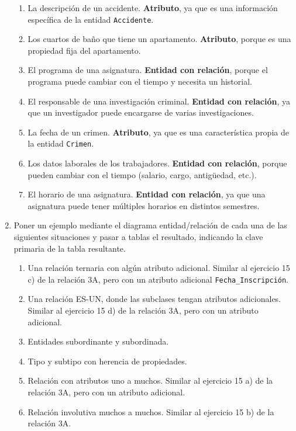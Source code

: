 \begin{enumerate}[label=\textbf{\arabic*.}, itemsep=0.5em]
\begin{enumerate}
        \item La descripción de un accidente.  
        \textbf{Atributo}, ya que es una información específica de la entidad \texttt{Accidente}.

        \item Los cuartos de baño que tiene un apartamento.  
        \textbf{Atributo}, porque es una propiedad fija del apartamento.

        \item El programa de una asignatura.  
        \textbf{Entidad con relación}, porque el programa puede cambiar con el tiempo y necesita un historial.

        \item El responsable de una investigación criminal.  
        \textbf{Entidad con relación}, ya que un investigador puede encargarse de varias investigaciones.

        \item La fecha de un crimen.  
        \textbf{Atributo}, ya que es una característica propia de la entidad \texttt{Crimen}.

        \item Los datos laborales de los trabajadores.  
        \textbf{Entidad con relación}, porque pueden cambiar con el tiempo (salario, cargo, antigüedad, etc.).

        \item El horario de una asignatura.  
        \textbf{Entidad con relación}, ya que una asignatura puede tener múltiples horarios en distintos semestres.
    \end{enumerate}

    \item Poner un ejemplo mediante el diagrama entidad/relación de cada una de las siguientes situaciones y pasar a tablas el resultado, indicando la clave primaria de la tabla resultante.
    \begin{enumerate}
        \item Una relación ternaria con algún atributo adicional.
        Similar al ejercicio 15 c) de la relación 3A, pero con un atributo adicional \texttt{Fecha\_Inscripción}.
        \item Una relación ES-UN, donde las subclases tengan atributos adicionales.
        Similar al ejercicio 15 d) de la relación 3A, pero con un atributo adicional.

        \item Entidades subordinante y subordinada.
        \item Tipo y subtipo con herencia de propiedades.
        \item Relación con atributos uno a muchos.
        Similar al ejercicio 15 a) de la relación 3A, pero con un atributo adicional.
        \item Relación involutiva muchos a muchos.
        Similar al ejercicio 15 b) de la relación 3A.
    \end{enumerate}


\end{enumerate}
